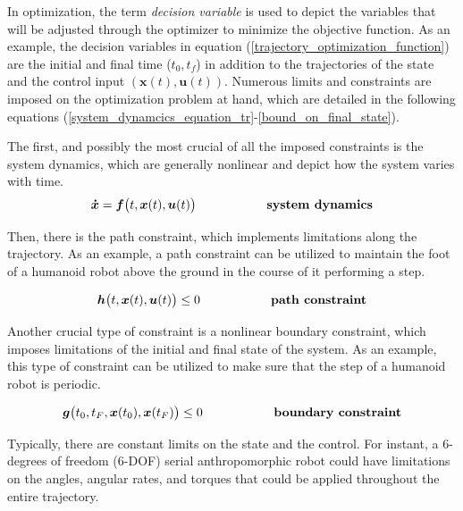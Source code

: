 \documentclass{thesisreport}
\begin{document}
\noindent In optimization, the term \textit{decision variable} is used to depict the variables that will be adjusted through the optimizer to minimize the objective function. As an example, the decision variables in equation (\ref{trajectory_optimization_function}) are the initial and final time ($t_0, t_f$) in addition to the trajectories of the state and the control input $(\bm{x}(t),\bm{u}(t))$.
Numerous limits and constraints are imposed on the optimization problem at hand, which are detailed in the following equations (\ref{system_dynamcics_equation_tr}-\ref{bound_on_final_state}). 

The first, and possibly the most crucial of all the imposed constraints is the system dynamics, which are generally nonlinear and depict how the system varies with time.
\begin{equation}\label{system_dynamcics_equation_tr}
	\bm{\dot{x}} = \bm{f}\big(t,\bm{x}(t),\bm{u}(t)\big) \space{\hspace{2cm} \textbf{system dynamics}}
\end{equation}
 

\newpage 
 
\noindent Then, there is the path constraint, which implements limitations along the trajectory. As an example, a path constraint can be utilized to maintain the foot of a humanoid robot above the ground in the course of it performing a step.
 
 
\begin{equation}
	\bm{h}\big(t,\bm{x}(t),\bm{u}(t)\big) \leq 0 \space{\hspace{2cm} \textbf{path constraint}}
\end{equation}
 
 
\noindent Another crucial type of constraint is a nonlinear boundary constraint, which imposes limitations of the initial and final state of the system. As an example, this type of constraint can be utilized to make sure that the step of a humanoid robot is periodic.
 
\begin{equation}
	\bm{g}\big(t_0,t_F,\bm{x}(t_0),\bm{x}(t_F)\big) \leq 0 \space{\hspace{2cm} \textbf{boundary constraint}}
\end{equation}
 
 Typically, there are constant limits on the state and the control. For instant, a 6-degrees of freedom (6-DOF) serial anthropomorphic robot  could have limitations on the angles, angular rates, and torques that could be applied throughout the entire trajectory. 
 
\end{document}
